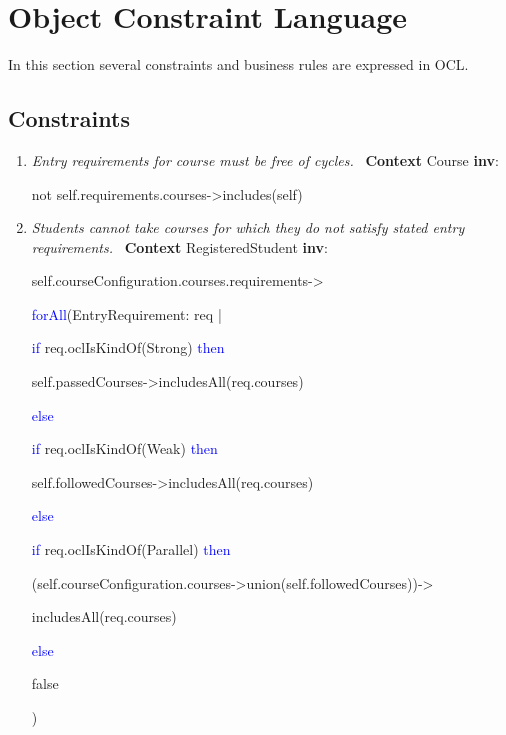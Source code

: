 \chapter{Object Constraint Language}

\npar In this section several constraints and business rules are expressed in
OCL. 

\section{Constraints}

\begin{enumerate}
	\item \emph{Entry requirements for course must be free of cycles.} \ 
	\npar \textbf{Context} Course \textbf{inv}:
	\par \hspace*{5 mm} not self.requirements.courses->includes(self)
	
	\item \emph{Students cannot take courses for which they do not satisfy stated
	entry requirements.} \
	\npar \textbf{Context} RegisteredStudent \textbf{inv}:
	\par \hspace*{5 mm} self.courseConfiguration.courses.requirements->
	\par \hspace*{10 mm} \textcolor{Blue}{forAll}(EntryRequirement: req |
	\par \hspace*{15 mm} \textcolor{Blue}{if} req.oclIsKindOf(Strong)
	\textcolor{Blue}{then} \par \hspace*{20 mm}
	self.passedCourses->includesAll(req.courses) 
	\par \hspace*{15 mm} \textcolor{Blue}{else}
	\par \hspace*{20 mm} \textcolor{Blue}{if} req.oclIsKindOf(Weak)
	\textcolor{Blue}{then}
	\par \hspace*{25 mm}
	self.followedCourses->includesAll(req.courses) 
	\par \hspace*{20 mm} \textcolor{Blue}{else}
	\par \hspace*{25 mm} \textcolor{Blue}{if} req.oclIsKindOf(Parallel)
	\textcolor{Blue}{then}
	\par \hspace*{30 mm}
	(self.courseConfiguration.courses->union(self.followedCourses))->
	\par \hspace*{32 mm}includesAll(req.courses)
	\par \hspace*{25 mm} \textcolor{Blue}{else}
	\par \hspace*{30 mm} false
	\par \hspace*{5 mm} )


\end{enumerate}
